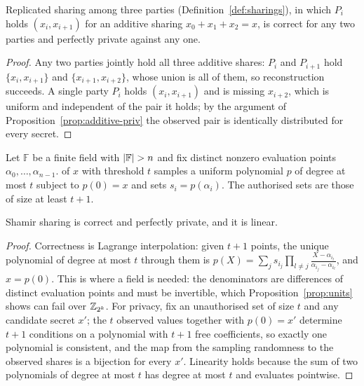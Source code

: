 \begin{proposition}
\label{prop:rep-priv}
Replicated sharing among three parties (Definition~\ref{def:sharings}), in which
$P_i$ holds $(x_i,x_{i+1})$ for an additive sharing $x_0+x_1+x_2 = x$, is correct
for any two parties and perfectly private against any one.
\end{proposition}

\begin{proof}
Any two parties jointly hold all three additive shares: $P_i$ and $P_{i+1}$ hold
$\{x_i,x_{i+1}\}$ and $\{x_{i+1},x_{i+2}\}$, whose union is all of them, so
reconstruction succeeds. A single party $P_i$ holds $(x_i,x_{i+1})$ and is missing
$x_{i+2}$, which is uniform and independent of the pair it holds; by the argument
of Proposition~\ref{prop:additive-priv} the observed pair is identically
distributed for every secret.
\end{proof}

\begin{definition}
\label{def:shamir}
Let $\mathbb{F}$ be a finite field with $\left\lvert \mathbb{F} \right\rvert > n$ and fix distinct
nonzero evaluation points $\alpha_0,\dots,\alpha_{n-1}$.  of
$x$ with threshold $t$ samples a uniform polynomial $p$ of degree at most $t$
subject to $p(0)=x$ and sets $s_i = p(\alpha_i)$. The authorised sets are those
of size at least $t+1$.
\end{definition}

\begin{proposition}
\label{prop:shamir}
Shamir sharing is correct and perfectly private, and it is linear.
\end{proposition}

\begin{proof}
Correctness is Lagrange interpolation: given $t+1$ points, the unique polynomial
of degree at most $t$ through them is
$p(X) = \sum_{j} s_{i_j} \prod_{l \ne j} \frac{X - \alpha_{i_l}}{\alpha_{i_j} -
\alpha_{i_l}}$, and $x = p(0)$. This is where a field is needed: the denominators
are differences of distinct evaluation points and must be invertible, which
Proposition~\ref{prop:units} shows can fail over $\mathbb{Z}_{2^k}$. For privacy, fix an
unauthorised set of size $t$ and any candidate secret $x'$; the $t$ observed
values together with $p(0)=x'$ determine $t+1$ conditions on a polynomial with
$t+1$ free coefficients, so exactly one polynomial is consistent, and the map
from the sampling randomness to the observed shares is a bijection for every
$x'$. Linearity holds because the sum of two polynomials of degree at most $t$
has degree at most $t$ and evaluates pointwise.
\end{proof}

